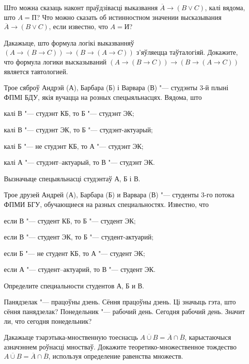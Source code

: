 \begin{problemList}

\problemItemSimple
{Што можна сказаць наконт праўдзівасці выказвання $\overline{A} \to (B \vee C)$, калі вядома, што $A = \mbox{П}$?}
{Что можно сказать об истинностном значении высказывания $\overline{A} \to (B \vee C)$, если известно, что $A = \mbox{И}$?}

\problemItemSimple
{Дакажыце, што формула логікі выказванняў $(A \to (B \to C)) \to (B \to (A \to C))$ з'яўляецца таўталогіяй.}
{Докажите, что формула логики высказываний $(A \to (B \to C)) \to (B \to (A \to C))$ является тавтологией.}

\problemItemSimple
{Трое сяброў Андрэй (А), Барбара (Б) і Варвара (В) "--- студэнты 3-й плыні ФПМІ БДУ, якія вучацца на розных спецыяльнасцях. Вядома, што
\begin{belarusianEnumerate}
	\item калі В "--- студэнт КБ, то Б "--- студэнт ЭК;
	\item калі В "--- студэнт ЭК, то Б "--- студэнт-актуарый;
	\item калі Б "--- не студэнт КБ, то А "--- студэнт ЭК;
	\item калі А "--- студэнт–актуарый, то В "--- студэнт ЭК.
\end{belarusianEnumerate}
Вызначыце спецыяльнасці студэнтаў А, Б і В.}
{Трое друзей Андрей (А), Барбара (Б) и Варвара (В) "--- студенты 3-го потока ФПМИ БГУ, обучающиеся на разных специальностях. Известно, что
\begin{russianEnumerate}
	\item если В "--- студент КБ, то Б "--- студент ЭК;
	\item если В "--- студент ЭК, то Б "--- студент-актуарий;
	\item если Б "--- не студент КБ, то А "--- студент ЭК;
	\item если А "--- студент–актуарий, то В "--- студент ЭК.
\end{russianEnumerate}
Определите специальности студентов А, Б и В.}

\problemItemSimple
{Панядзелак "--- працоўны дзень. Сёння працоўны дзень. Ці значыць гэта, што сёння панядзелак?}
{Понедельник "--- рабочий день. Сегодня рабочий день. Значит ли, что сегодня понедельник?}

\problemItemSimple
{Дакажыце тэарэтыка-мноственную тоеснасць $\overline{A \cup B} = \overline{A} \cap \overline{B}$, карыстаючыся азначэннем роўнасці мностваў.}
{Докажите теоретико-множественное тождество $\overline{A \cup B} = \overline{A} \cap \overline{B}$, используя определение равенства множеств.}


\end{problemList}
